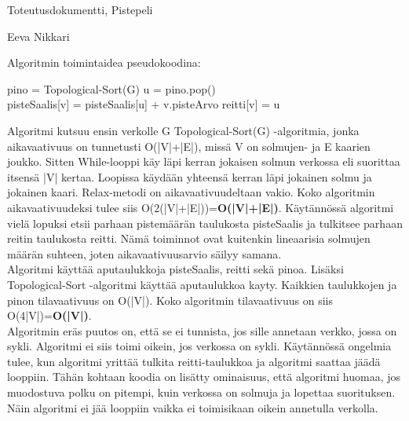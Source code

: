 \documentclass[12pt,a4paper,leqno]{amsart}
\begin{document}
\begin{flushleft}
				Toteutusdokumentti, Pistepeli
				\end{flushleft}				\begin{flushright}
				Eeva Nikkari
				\end{flushright}
				
				
Algoritmin toimintaidea pseudokoodina:
\begin{algorithm}
\begin{algorithmic}
	\State pino = Topological-Sort(G)
		\State u = pino.pop()
				\State {}
			\EndFor
	\EndWhile
\EndFunction
\\

\State pisteSaalis[v] = pisteSaalis[u] + v.pisteArvo
\State reitti[v] = u
\EndIf
\EndFunction
\end{algorithmic}
\end{algorithm}


Algoritmi kutsuu ensin verkolle G Topological-Sort(G) -algoritmia, jonka aikavaativuus on tunnetusti O(|V|+|E|), missä V on solmujen- ja E kaarien joukko. Sitten While-looppi käy läpi kerran jokaisen solmun verkossa eli suorittaa itsensä |V| kertaa. Loopissa käydään yhteensä kerran läpi jokainen solmu ja jokainen kaari. Relax-metodi on aikavaativuudeltaan vakio. Koko algoritmin aikavaativuudeksi tulee siis O(2(|V|+|E|))=\textbf{O(|V|+|E|)}. Käytännössä algoritmi vielä lopuksi etsii parhaan pistemäärän taulukosta pisteSaalis ja tulkitsee parhaan reitin taulukosta reitti. Nämä toiminnot ovat kuitenkin lineaarisia solmujen määrän suhteen, joten aikavaativuusarvio säilyy samana.\\

Algoritmi käyttää aputaulukkoja pisteSaalis, reitti sekä pinoa. Lisäksi Topological-Sort -algoritmi käyttää aputaulukkoa kayty. Kaikkien taulukkojen ja pinon tilavaativuus on O(|V|). Koko algoritmin tilavaativuus on siis O(4|V|)=\textbf{O(|V|)}.\\

Algoritmin eräs puutos on, että se ei tunnista, jos sille annetaan verkko, jossa on sykli. Algoritmi ei siis toimi oikein, jos verkossa on sykli. Käytännössä ongelmia tulee, kun algoritmi yrittää tulkita reitti-taulukkoa ja algoritmi saattaa jäädä looppiin. Tähän kohtaan koodia on lisätty ominaisuus, että algoritmi huomaa, jos muodostuva polku on pitempi, kuin verkossa on solmuja ja lopettaa suorituksen. Näin algoritmi ei jää looppiin vaikka ei toimisikaan oikein annetulla verkolla.
\end{document}
